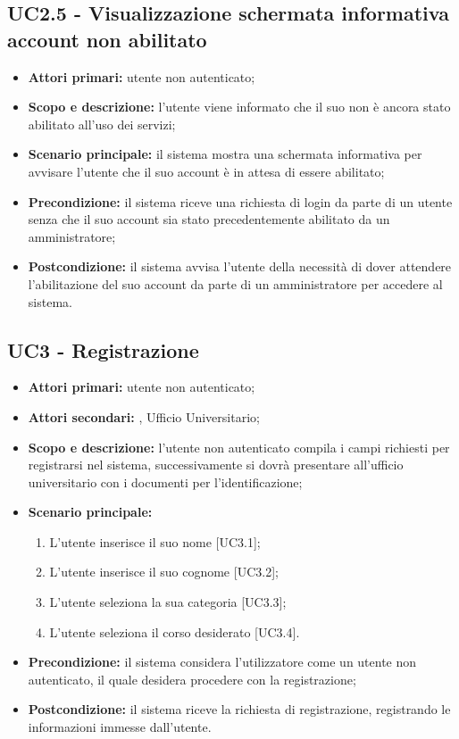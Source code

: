 \documentclass[AnalisiDeiRequisiti.tex]{subfiles}
\begin{document}
\subsection{UC2.5 - Visualizzazione schermata informativa account non abilitato}
\begin{itemize}
	\item \textbf{Attori primari:} utente non autenticato;
	\item \textbf{Scopo e descrizione:} l'utente viene informato che il suo  non è ancora stato abilitato all'uso dei servizi;
	\item \textbf{Scenario principale:} il sistema mostra una schermata informativa per avvisare l'utente che il suo account è in attesa di essere abilitato;
	\item \textbf{Precondizione:} il sistema riceve una richiesta di login da parte di un utente senza che il suo account sia stato precedentemente abilitato da un amministratore;
	\item \textbf{Postcondizione:} il sistema avvisa l'utente della necessità di dover attendere l'abilitazione del suo account da parte di un amministratore per accedere al sistema.
\end{itemize}
\subsection{UC3 - Registrazione}
\begin{itemize}
	\item \textbf{Attori primari:} utente non autenticato;
	\item \textbf{Attori secondari:} , Ufficio Universitario;
	\item \textbf{Scopo e descrizione:} l'utente non autenticato compila i campi richiesti per registrarsi nel sistema, successivamente si dovrà presentare all'ufficio universitario con i documenti per l'identificazione;
	\item \textbf{Scenario principale:}
	\begin{enumerate}
		\item L'utente inserisce il suo nome [UC3.1];
		\item L'utente inserisce il suo cognome [UC3.2];
		\item L'utente seleziona la sua categoria [UC3.3];
		\item L'utente seleziona il corso desiderato [UC3.4].
	\end{enumerate}
	\item \textbf{Precondizione:} il sistema considera l'utilizzatore come un utente non autenticato, il quale desidera procedere con la registrazione;
	\item \textbf{Postcondizione:} il sistema riceve la richiesta di registrazione, registrando le informazioni immesse dall'utente.
\end{itemize}
\end{document}
